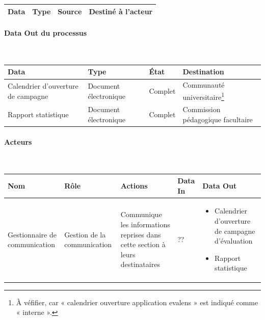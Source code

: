 \documentclass[a4paper,11pt]{report}
\begin{document}
\begin{tabularx}{\linewidth}{|X|X|X|X|} \hline
Data & Type & Source & Destiné à l'acteur \\ \hline

\end{tabularx}

\paragraph{Data Out du processus}~\newline{}

\begin{tabularx}{\linewidth}{|X|X|X|X|} \hline
Data & Type & État & Destination \\ \hline
Calendrier d'ouverture de campagne & Document électronique & Complet & Communauté universitaire\footnote{À véfifier, car « calendrier ouverture application evalens » est indiqué comme « interne ».} \\
Rapport statistique & Document électronique & Complet & Commission pédagogique facultaire \\ \hline
\end{tabularx}

\paragraph{Acteurs}~\newline{}

\begin{tabularx}{\linewidth}{|X|X|X|X|X|} \hline
Nom & Rôle & Actions & Data In & Data Out \\ \hline 
Gestionnaire de communication & Gestion de la communication & Communique les informations reprises dans cette section à leurs destinataires & ?? & 
	\begin{itemize} 
		\item Calendrier d'ouverture de campagne d'évaluation
		\item Rapport statistique
	\end{itemize}
\\ \hline
\end{tabularx}










\end{document}
